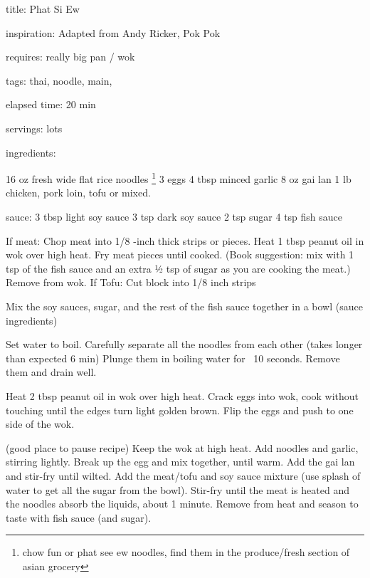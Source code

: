 title: Phat Si Ew 


inspiration: Adapted from Andy Ricker, Pok Pok 


requires: really big pan / wok

tags: thai, noodle, main, 

elapsed time: 20 min

servings: lots 


ingredients: 

	16 oz fresh wide flat rice noodles \footnote{chow fun or phat see ew noodles, find them in the produce/fresh section of asian grocery}
	3 eggs
	4 tbsp minced garlic
	8 oz gai lan
	1 lb chicken, pork loin, tofu or mixed. 

	sauce: 
		3 tbsp light soy sauce
		3 tsp dark soy sauce
		2 tsp sugar
		4 tsp fish sauce


If meat: 
	Chop meat into 1/8 -inch thick strips or pieces.
	Heat 1 tbsp peanut oil in wok over high heat.
	Fry meat pieces until cooked. 
	(Book suggestion: mix with 1 tsp of the fish sauce and an extra ½ tsp of sugar as you are cooking the meat.)
	Remove from wok.
If Tofu: 
	Cut block into 1/8 inch strips 

Mix the soy sauces, sugar, and the rest of the fish sauce together in a bowl (sauce ingredients)

Set water to boil.
Carefully separate all the noodles from each other (takes longer than expected 6 min)
Plunge them in boiling water for ~10 seconds.
Remove them and drain well. 

Heat 2 tbsp peanut oil in wok over high heat.
Crack eggs into wok, cook without touching until the edges turn light golden brown.
Flip the eggs and push to one side of the wok.

(good place to pause recipe)
Keep the wok at high heat.
Add noodles and garlic, stirring lightly.
Break up the egg and mix together, until warm.
Add the gai lan and stir-fry until wilted. 
Add the meat/tofu and soy sauce mixture (use splash of water to get all the sugar from the bowl).
Stir-fry until the meat is heated and the noodles absorb the liquids, about 1 minute.
Remove from heat and season to taste with fish sauce (and sugar). 
